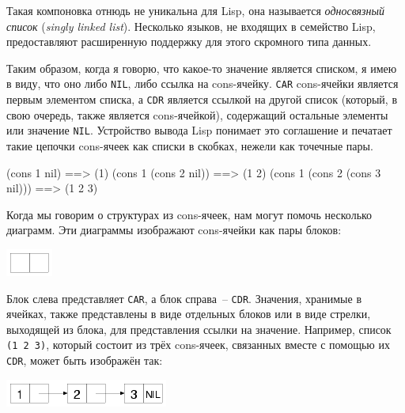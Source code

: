 Такая компоновка отнюдь не уникальна для Lisp, она называется \textit{односвязный
список} (\textit{singly linked list}). Несколько языков, не входящих в семейство Lisp,
предоставляют расширенную поддержку для этого скромного типа данных.

Таким образом, когда я говорю, что какое-то значение является списком, я имею в виду, что
оно либо \lstinline{NIL}, либо ссылка на cons-ячейку. \lstinline{CAR} cons-ячейки является первым
элементом списка, а \lstinline{CDR} является ссылкой на другой список (который, в свою очередь,
также является cons-ячейкой), содержащий остальные элементы или значение
\lstinline{NIL}. Устройство вывода Lisp понимает это соглашение и печатает такие цепочки
cons-ячеек как списки в скобках, нежели как точечные пары.

\begin{myverb}
(cons 1 nil)                   ==> (1)
(cons 1 (cons 2 nil))          ==> (1 2)
(cons 1 (cons 2 (cons 3 nil))) ==> (1 2 3)
\end{myverb}

Когда мы говорим о структурах из cons-ячеек, нам могут помочь несколько диаграмм. Эти
диаграммы изображают cons-ячейки как пары блоков:

\begin{center}
\includegraphics[scale=0.6]{images/one-cons-cell.png}
\end{center}

Блок слева представляет \lstinline{CAR}, а блок справа~-- \lstinline{CDR}. Значения, хранимые в
ячейках, также представлены в виде отдельных блоков или в виде стрелки, выходящей из блока,
для представления ссылки на значение. Например, список \lstinline{(1 2 3)}, который состоит из трёх cons-ячеек,
связанных вместе с помощью их \lstinline{CDR}, может быть изображён так:

\begin{center}
  \includegraphics[scale=0.6]{images/list-1-2-3.png}
\end{center}


